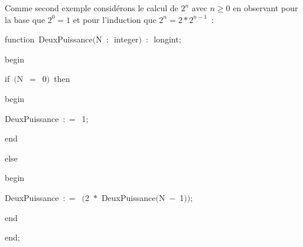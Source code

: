 {\begin{minipage}{\myparboxwidth}
\noindent Comme second exemple considérons le calcul de $2^{n}$ avec $n \geq 0$ en observant pour la base
que $2^{0} = 1$ et pour l'induction que $2^{n} = 2 \ast 2^{n-1}$~:

\smallskip
\mbox{\blc  \blk\idt  \mcl function\idt \ DeuxPuissance$($N\ $:$\ integer$)$\ $:$\ longint$;$}\par 
\mbox{\blc  \blk\idt  \mcl begin\idt }\par 
\mbox{\blc  \blk\blk\idt  \mcl if\idt \ $($N\ $=$\ 0$)$\ \mcl then\idt }\par 
\mbox{\blc  \blk\blk\blk\idt  \mcl begin\idt }\par 
\mbox{\blc  \blk\blk\blk\blk\idt  DeuxPuissance\ $:$$=$\ 1$;$}\par 
\mbox{\blc  \blk\blk\blk\idt  \mcl end\idt }\par 
\mbox{\blc  \blk\blk\idt  \mcl else\idt }\par 
\mbox{\blc  \blk\blk\blk\idt  \mcl begin\idt }\par 
\mbox{\blc  \blk\blk\blk\blk\idt  DeuxPuissance\ $:$$=$\ $($2\ $\ast$\ DeuxPuissance$($N\ $-$\ 1$)$$)$$;$}\par 
\mbox{\blc  \blk\blk\blk\idt  \mcl end\idt }\par 
\mbox{\blc  \blk\idt  \mcl end\idt $;$}\par 
\smallskip

\vspace{\abovedisplayskip}
\end{minipage}
}

